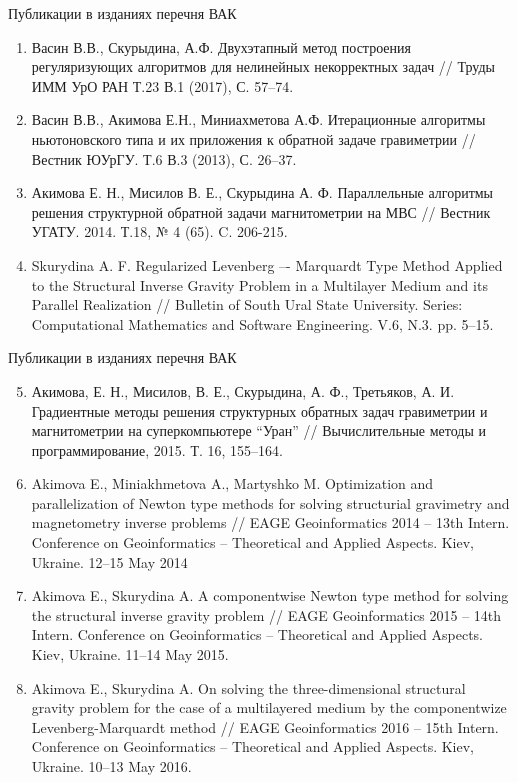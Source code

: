 \documentclass[10pt,pdf, mathserif, hyperref={unicode}]{beamer}
\begin{document}
\begin{frame}{Публикации в изданиях перечня ВАК}
	\begin{enumerate}
		\item Васин В.В., Скурыдина, А.Ф. Двухэтапный метод построения регуляризующих алгоритмов для нелинейных некорректных задач // Труды ИММ УрО РАН Т.23 В.1 (2017), С. 57–74.
		\item Васин В.В., Акимова Е.Н., Миниахметова А.Ф. Итерационные алгоритмы ньютоновского типа и их приложения к обратной задаче гравиметрии // Вестник ЮУрГУ. Т.6 В.3 (2013), С. 26–37.
		\item Акимова Е. Н., Мисилов В. Е., Скурыдина А. Ф. Параллельные алгоритмы решения структурной обратной задачи магнитометрии на МВС // Вестник УГАТУ. 2014. Т.18, № 4 (65). C. 206-215.
		\item Skurydina A. F. Regularized Levenberg –- Marquardt Type Method Applied to the Structural Inverse Gravity Problem in a Multilayer Medium and its Parallel Realization // Bulletin of South Ural State University. Series: Computational Mathematics and Software Engineering. V.6, N.3. pp. 5--15.
	\end{enumerate}
\end{frame}
\begin{frame}{Публикации в изданиях перечня ВАК}
	\begin{enumerate}
		\setcounter{enumi}{4}
		\item Акимова, Е. Н., Мисилов, В. Е., Скурыдина, А. Ф., Третьяков, А. И. Градиентные методы решения структурных обратных задач гравиметрии и магнитометрии на суперкомпьютере “Уран” // Вычислительные методы и программирование, 2015. Т. 16, 155–164.
		\item Akimova E., Miniakhmetova A., Martyshko M. Optimization and parallelization of Newton type methods for solving structurial gravimetry and magnetometry inverse problems // EAGE Geoinformatics 2014 – 13th Intern. Conference on Geoinformatics – Theoretical and Applied Aspects. Kiev, Ukraine. 12–15 May 2014
		\item Akimova E., Skurydina A. A componentwise Newton type method for solving the structural inverse gravity problem // EAGE Geoinformatics 2015 – 14th Intern. Conference on Geoinformatics – Theoretical and Applied Aspects. Kiev, Ukraine. 11–14 May 2015.
		\item Akimova E., Skurydina A. On solving the three-dimensional structural gravity problem for the case of a multilayered medium by the componentwize Levenberg-Marquardt method // EAGE Geoinformatics 2016 – 15th Intern. Conference on Geoinformatics – Theoretical and Applied Aspects. Kiev, Ukraine. 10–13 May 2016.
	\end{enumerate}
\end{frame}
\end{document}
